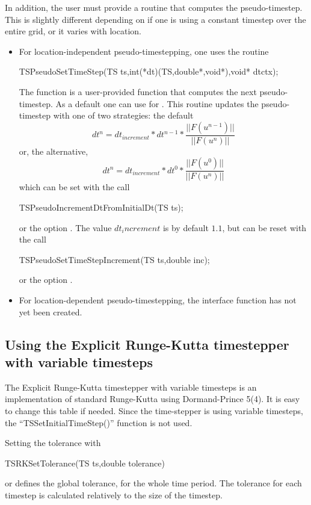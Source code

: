 In addition, the user must provide a routine that computes the 
pseudo-timestep. This is slightly different depending on if 
one is using a constant timestep over the entire grid, or it varies
with location. 
\begin{itemize}
\item For location-independent pseudo-timestepping, one uses the routine 
\begin{tabbing}
 TSPseudoSetTimeStep(TS ts,int(*dt)(TS,double*,void*),void* dtctx);
\end{tabbing}
The function  is a user-provided function that computes the next 
pseudo-timestep. As a default one can use
 for . This routine
updates the pseudo-timestep with one of two strategies: the default
\[
   dt^{n} = dt_{increment}*dt^{n-1}*\frac{|| F(u^{n-1}) ||}{|| F(u^{n})||}
\]
or, the alternative, 
\[
   dt^{n} = dt_{increment}*dt^{0}*\frac{|| F(u^{0}) ||}{|| F(u^{n})||}
\]
which can be set with the call
\begin{tabbing}
 TSPseudoIncrementDtFromInitialDt(TS ts);
\end{tabbing}
or  
the option . 
The value $ dt_increment $ is by default $ 1.1$, but can be reset with the 
call 
\begin{tabbing}
 TSPseudoSetTimeStepIncrement(TS ts,double inc); 
\end{tabbing}
or  the option 
. 


\item For location-dependent pseudo-timestepping, the interface function
      has not yet been created.
\end{itemize}

\subsection{Using the Explicit Runge-Kutta timestepper with variable timesteps}
The Explicit Runge-Kutta timestepper with variable timesteps is an
implementation of standard Runge-Kutta using Dormand-Prince
5(4). It is easy to change this table if needed. Since the time-stepper is using variable timesteps, the
``TSSetInitialTimeStep()'' function is not used.

Setting the tolerance with 
\begin{tabbing}
TSRKSetTolerance(TS ts,double tolerance)
\end{tabbing}
or   
defines the global tolerance, for the whole time
period. The tolerance for each timestep is calculated relatively to
the size of the timestep.

